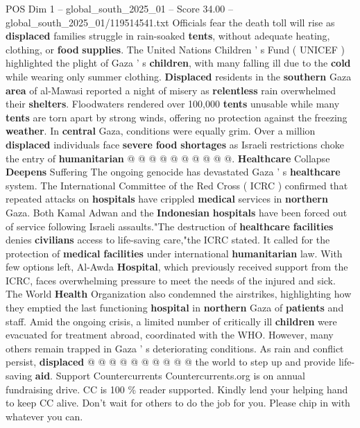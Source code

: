 \begin{textsample}{POS Dim 1 – global\_south\_2025\_01 – Score 34.00 – global\_south\_2025\_01/119514541.txt}
Officials fear the death toll will rise as \textbf{displaced} families struggle in rain-soaked \textbf{tents}, without adequate heating, clothing, or \textbf{food} \textbf{supplies}.
The United Nations Children ' s Fund ( UNICEF ) highlighted the plight of Gaza ' s \textbf{children}, with many falling ill due to the \textbf{cold} while wearing only summer clothing. \textbf{Displaced} residents in the \textbf{southern} Gaza \textbf{area} of al-Mawasi reported a night of misery as \textbf{relentless} rain overwhelmed their \textbf{shelters}.
Floodwaters rendered over 100,000 \textbf{tents} unusable while many \textbf{tents} are torn apart by strong winds, offering no protection against the freezing \textbf{weather}.
In \textbf{central} Gaza, conditions were equally grim.
Over a million \textbf{displaced} individuals face \textbf{severe} \textbf{food} \textbf{shortages} as Israeli restrictions choke the entry of \textbf{humanitarian} @ @ @ @ @ @ @ @ @ @. \textbf{Healthcare} Collapse \textbf{Deepens} Suffering The ongoing genocide has devastated Gaza ' s \textbf{healthcare} system.
The International Committee of the Red Cross ( ICRC ) confirmed that repeated attacks on \textbf{hospitals} have crippled \textbf{medical} services in \textbf{northern} Gaza.
Both Kamal Adwan and the \textbf{Indonesian} \textbf{hospitals} have been forced out of service following Israeli assaults."The destruction of \textbf{healthcare} \textbf{facilities} denies \textbf{civilians} access to life-saving care,"the ICRC stated.
It called for the protection of \textbf{medical} \textbf{facilities} under international \textbf{humanitarian} law.
With few options left, Al-Awda \textbf{Hospital}, which previously received support from the ICRC, faces overwhelming pressure to meet the needs of the injured and sick.
The World \textbf{Health} Organization also condemned the airstrikes, highlighting how they emptied the last functioning \textbf{hospital} in \textbf{northern} Gaza of \textbf{patients} and staff.
Amid the ongoing crisis, a limited number of critically ill \textbf{children} were evacuated for treatment abroad, coordinated with the WHO.
However, many others remain trapped in Gaza ' s deteriorating conditions.
As rain and conflict persist, \textbf{displaced} @ @ @ @ @ @ @ @ @ @ the world to step up and provide life-saving \textbf{aid}.
Support Countercurrents Countercurrents.org is on annual fundraising drive.
CC is 100 \% reader supported.
Kindly lend your helping hand to keep CC alive.
Don't wait for others to do the job for you.
Please chip in with whatever you can.

\end{textsample}
